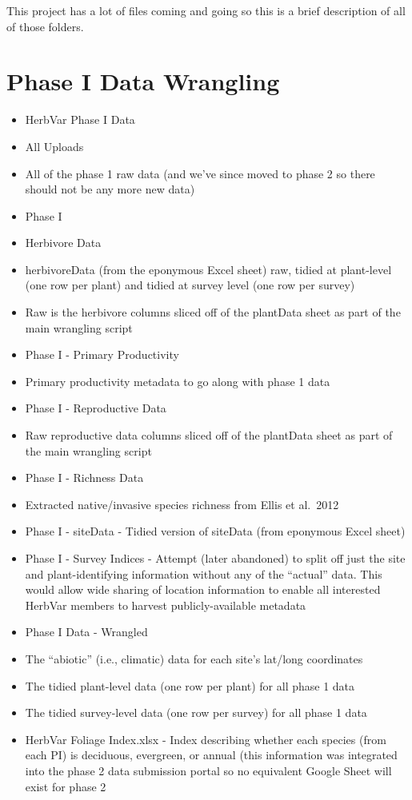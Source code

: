 \documentclass[
  letterpaper,
  oneside,
  open=any]{scrbook}
\begin{document}
This project has a lot of files coming and going so this is a brief
description of all of those folders.

\section{Phase I Data Wrangling}\label{phase-i-data-wrangling}

\begin{itemize}
\item
  HerbVar Phase I Data
\item
  All Uploads
\item
  All of the phase 1 raw data (and we've since moved to phase 2 so there
  should not be any more new data)
\item
  Phase I
\item
  Herbivore Data
\item
  herbivoreData (from the eponymous Excel sheet) raw, tidied at
  plant-level (one row per plant) and tidied at survey level (one row
  per survey)
\item
  Raw is the herbivore columns sliced off of the plantData sheet as part
  of the main wrangling script
\item
  Phase I - Primary Productivity
\item
  Primary productivity metadata to go along with phase 1 data
\item
  Phase I - Reproductive Data
\item
  Raw reproductive data columns sliced off of the plantData sheet as
  part of the main wrangling script
\item
  Phase I - Richness Data
\item
  Extracted native/invasive species richness from Ellis et al.~2012
\item
  Phase I - siteData - Tidied version of siteData (from eponymous Excel
  sheet)
\item
  Phase I - Survey Indices - Attempt (later abandoned) to split off just
  the site and plant-identifying information without any of the
  ``actual'' data. This would allow wide sharing of location information
  to enable all interested HerbVar members to harvest publicly-available
  metadata
\item
  Phase I Data - Wrangled
\item
  The ``abiotic'' (i.e., climatic) data for each site's lat/long
  coordinates
\item
  The tidied plant-level data (one row per plant) for all phase 1 data
\item
  The tidied survey-level data (one row per survey) for all phase 1 data
\item
  HerbVar Foliage Index.xlsx - Index describing whether each species
  (from each PI) is deciduous, evergreen, or annual (this information
  was integrated into the phase 2 data submission portal so no
  equivalent Google Sheet will exist for phase 2
\end{itemize}
\end{document}
